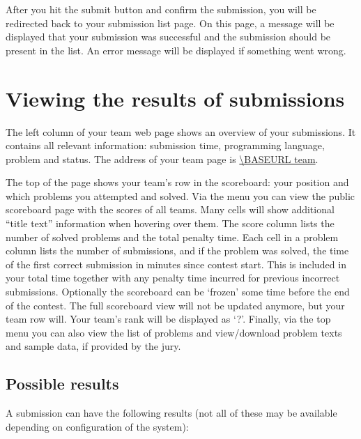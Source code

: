 After you hit the submit button and confirm the submission, you will
be redirected back to your submission list page. On this page, a message
will be displayed that your submission was successful and the
submission should be present in the list. An error message will be
displayed if something went wrong.

\section{Viewing the results of submissions}

The left column of your team web page shows an overview of your submissions.
It contains all relevant information: submission time, programming
language, problem and status. The address of your team page is
\url{\BASEURL team}.

The top of the page shows your team's row in the scoreboard: your position and
which problems you attempted and solved. Via the menu you can view the public
scoreboard page with the scores of all teams. Many cells will show
additional ``title text'' information when hovering over them. The
score column lists the number of solved problems and the total penalty
time. Each cell in a problem column lists the number of submissions,
and if the problem was solved, the time of the first correct
submission in minutes since contest start. This is included in your
total time together with any penalty time incurred for previous
incorrect submissions. Optionally the scoreboard can
be `frozen' some time before the end of the contest. The full scoreboard view
will not be updated anymore, but your team row will. Your team's rank will
be displayed as `?'. Finally, via the top menu you can also view the
list of problems and view/download problem texts and sample data, if
provided by the jury.

\subsection{Possible results}

A submission can have the following results (not all of these may be
available depending on configuration of the system):

